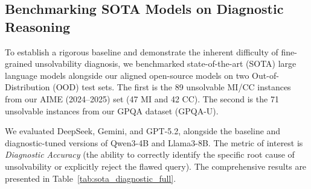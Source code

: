 \subsection{Benchmarking SOTA Models on Diagnostic Reasoning}
To establish a rigorous baseline and demonstrate the inherent difficulty of fine-grained unsolvability diagnosis, we benchmarked state-of-the-art (SOTA) large language models alongside our aligned open-source models on two Out-of-Distribution (OOD) test sets. The first is the 89 unsolvable MI/CC instances from our AIME (2024--2025) set (47 MI and 42 CC). The second is the 71 unsolvable instances from our GPQA dataset (GPQA-U).

We evaluated DeepSeek, Gemini, and GPT-5.2, alongside the baseline and diagnostic-tuned versions of Qwen3-4B and Llama3-8B. The metric of interest is \textit{Diagnostic Accuracy} (the ability to correctly identify the specific root cause of unsolvability or explicitly reject the flawed query). The comprehensive results are presented in Table~\ref{tab:sota_diagnostic_full}.

\begin{table}[t] %
\centering
\small
{}
\caption{Comprehensive diagnostic performance (\%) across all evaluated models on OOD unsolvable instances. The table juxtaposes our aligned open-source models (4B/8B) against massive proprietary SOTA models. Note how diagnostic tuning (\textit{+Diag.}) enables smaller models to bridge the gap and occasionally surpass SOTA baselines (e.g., Llama3-8B on CC and GPQA-U).}
\label{tab:sota_diagnostic_full}
\end{table}

